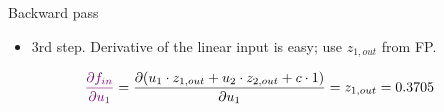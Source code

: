 \begin{vbframe}{Backward pass}
  \begin{itemize}
    \item 3rd step. Derivative of the linear input is easy; use ${z_{1, out}}$ from FP.
  \end{itemize}
    \begin{eqnarray*}
      \textcolor{violet}{\frac{\partial f_{in}}{\partial u_1}} = \frac{\partial (u_1 \cdot z_{1,out} + u_2 \cdot z_{2,out} + c \cdot 1)}{\partial u_1} = {z_{1, out}} = \num[round-mode=places,round-precision=4]{0.3705169}
    \end{eqnarray*}
    \begin{figure}
      \centering
    \end{figure}
\framebreak


\end{vbframe}
